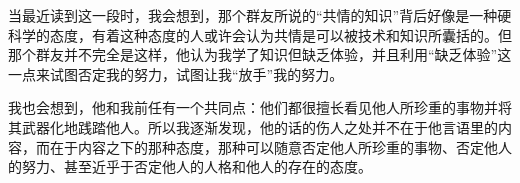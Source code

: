 


当最近读到这一段时，我会想到，那个群友所说的“共情的知识”背后好像是一种硬科学的态度，有着这种态度的人或许会认为共情是可以被技术和知识所囊括的。但那个群友并不完全是这样，他认为我学了知识但缺乏体验，并且利用“缺乏体验”这一点来试图否定我的努力，试图让我“放手”我的努力。

我也会想到，他和我前任有一个共同点：他们都很擅长看见他人所珍重的事物并将其武器化地践踏他人。所以我逐渐发现，他的话的伤人之处并不在于他言语里的内容，而在于内容之下的那种态度，那种可以随意否定他人所珍重的事物、否定他人的努力、甚至近乎于否定他人的人格和他人的存在的态度。
